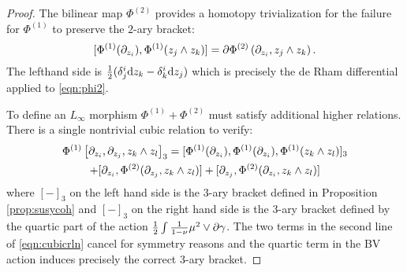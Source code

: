 \begin{proof}
The bilinear map $\Phi^{(2)}$ provides a homotopy trivialization for the failure for $\Phi^{(1)}$ to preserve the $2$-ary bracket: 
\[
[\Phi^{(1)} (\partial_{z_i}) , \Phi^{(1)}(z_j \wedge z_k)] = \partial \Phi^{(2)}\left(\partial_{z_i} , z_j \wedge z_k\right).
\]
The lefthand side is $\frac12 (\delta_j^i {\rm d} z_k - \delta_k^i {\rm d} z_j)$ which is precisely the de Rham differential applied to \eqref{eqn:phi2}.

To define an $L_\infty$ morphism $\Phi^{(1)} + \Phi^{(2)}$ must satisfy additional higher relations. 
There is a single nontrivial cubic relation to verify:
\begin{multline} \label{eqn:cubicrln}
\Phi^{(1)}\left[\partial_{z_i}, \partial_{z_j}, z_k \wedge z_l\right]_3 = [\Phi^{(1)}(\partial_{z_i}), \Phi^{(1)}(\partial_{z_i}), \Phi^{(1)}(z_k \wedge z_l)]_3 \\ + [\partial_{z_i}, \Phi^{(2)}(\partial_{z_j}, z_k \wedge z_l)] + [\partial_{z_j}, \Phi^{(2)}(\partial_{z_i}, z_k \wedge z_l)]
\end{multline}
where $[-]_3$ on the left hand side is the $3$-ary bracket defined in Proposition \ref{prop:susycoh} and $[-]_3$ on the right hand side is the $3$-ary bracket defined by the quartic part of the action $\frac12 \int \frac{1}{1-\nu} \mu^2 \vee \partial \gamma$. 
The two terms in the second line of \eqref{eqn:cubicrln} cancel for symmetry reasons and the quartic term in the BV action induces precisely the correct $3$-ary bracket. 

\end{proof}

